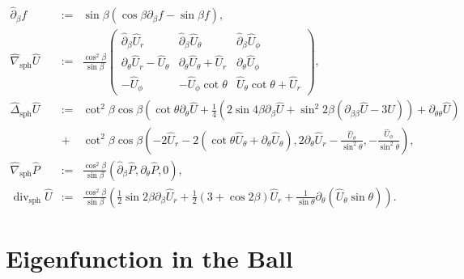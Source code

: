 \documentclass[11pt,a4paper]{article}
\numberwithin{equation}{section}
\newcommand{\assign}{:=}
\newcommand{\tmop}[1]{\ensuremath{\operatorname{#1}}}
\begin{document}
\begin{eqnarray*}
  \widehat{\partial}_{\beta} f & \assign & \sin \beta (\cos \beta
  \partial_{\beta} f - \sin \beta f),\\
  \widehat{\nabla}_{\tmop{sph}} \widehat{U}  & \assign & \frac{\cos^2 \beta}{\sin \beta}
  \left(\begin{array}{ccc}
    \widehat{\partial}_{\beta} \widehat{U} _r & \widehat{\partial}_{\beta} \widehat{U} _{\theta} &
    \widehat{\partial}_{\beta} \widehat{U} _{\phi}\\
    \partial_{\theta} \widehat{U} _r - \widehat{U} _{\theta} & \partial_{\theta} \widehat{U} _{\theta} + \widehat{U} _r &
    \partial_{\theta} \widehat{U} _{\phi}\\
    - \widehat{U} _{\phi} & - \widehat{U} _{\phi} \cot \theta & \widehat{U} _{\theta} \cot \theta + \widehat{U} _r
  \end{array}\right),\\
  \widehat{\Delta}_{\tmop{sph}} \widehat{U} & \assign & \cot^2 \beta \cos \beta \left(
  \cot \theta \partial_{\theta} \widehat{U} + \frac{1}{4}  (2 \sin 4 \beta
  \partial_{\beta} \widehat{U} + \sin^2 2 \beta (\partial_{\beta \beta} \widehat{U} - 3 \widehat{U})) +
  \partial_{\theta \theta}  \widehat{U} \right)\\
  & + & \cot^2 \beta \cos \beta \left( - 2 \widehat{U}_r - 2 (\cot \theta \widehat{U}_{\theta} +
  \partial_{\theta} \widehat{U}_{\theta}), 2 \partial_{\theta} \widehat{U}_r -
  \frac{\widehat{U}_{\theta}}{\sin^2 \theta}, - \frac{\widehat{U}_{\phi}}{\sin^2 \theta}
  \right),\\
  \widehat{\nabla}_{\tmop{sph}} \widehat{P} & \assign & \frac{\cos^2 \beta}{\sin \beta}
  (\widehat{\partial}_{\beta} \widehat{P}, \partial_{\theta} \widehat{P}, 0),\\
  \widehat{\tmop{div}}_{\tmop{sph}} \widehat{U} & \assign & \frac{\cos^2 \beta}{\sin
  \beta} \left( \frac{1}{2} \sin 2 \beta \partial_{\beta} \widehat{U}_r + \frac{1}{2} (3
  + \cos 2 \beta) \widehat{U}_r + \frac{1}{\sin \theta} \partial_{\theta}  (\widehat{U}_{\theta}
  \sin \theta) \right) .
\end{eqnarray*}



\section{Eigenfunction in the Ball}\label{eig cons}
\end{document}

